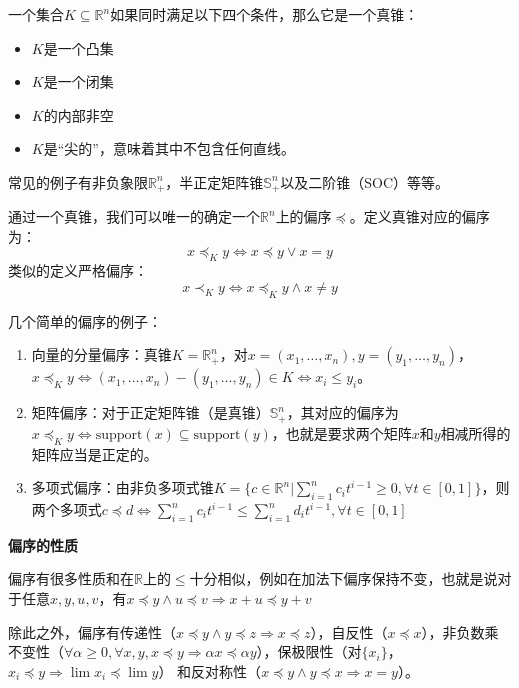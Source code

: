 \documentclass[12pt,a4paper]{book}
\begin{document}
一个集合$K\subseteq\mathbb{R}^n$如果同时满足以下四个条件，那么它是一个真锥：
\begin{itemize}
    \item $K$是一个凸集
    \item $K$是一个闭集
    \item $K$的内部非空
    \item $K$是“尖的”，意味着其中不包含任何直线。
\end{itemize}
常见的例子有非负象限$\mathbb{R}^n_+$，半正定矩阵锥$\mathbb{S}^n_+$以及二阶锥（SOC）等等。

通过一个真锥，我们可以唯一的确定一个$\mathbb{R}^n$上的偏序$\preceq$。定义真锥对应的偏序为：
\begin{equation}
    x\preceq_K y \Leftrightarrow x\preceq y \vee x=y
\end{equation}
类似的定义严格偏序：
\begin{equation}
    x\prec_K y \Leftrightarrow x\preceq_K y \wedge x\neq y
\end{equation}

几个简单的偏序的例子：
\begin{enumerate}
    \item 向量的分量偏序：真锥$K=\mathbb{R}^n_+$，对$x = (x_1,\ldots,x_n),y=(y_1,\ldots,y_n)$，$x\preceq_K y \Leftrightarrow (x_1,\ldots,x_n) - (y_1,\ldots,y_n) \in K \Leftrightarrow x_i\leq y_i$。
    \item 矩阵偏序：对于正定矩阵锥（是真锥）$\mathbb{S}^n_+$，其对应的偏序为$x\preceq_K y \Leftrightarrow \text{support}(x)\subseteq \text{support}(y)$，也就是要求两个矩阵$x$和$y$相减所得的矩阵应当是正定的。
    \item 多项式偏序：由非负多项式锥$K=\{c\in\mathbb{R}^n|\sum_{i=1}^n c_it^{i-1}\geq 0,\forall t \in [0,1]\}$，则两个多项式$c\preceq d \Leftrightarrow \sum_{i=1}^n c_it^{i-1} \leq \sum_{i=1}^n d_it^{i-1},\forall t\in [0,1]$
\end{enumerate}

\textbf{偏序的性质}

偏序有很多性质和在$\mathbb{R}$上的$\leq$十分相似，例如在加法下偏序保持不变，也就是说对于任意$x,y,u,v$，有$x\preceq y \wedge u\preceq v \Rightarrow  x+u\preceq y+v$

除此之外，偏序有传递性（$x\preceq y \wedge y\preceq z\Rightarrow x\preceq z$），自反性（$x\preceq x$），非负数乘不变性（$\forall \alpha \geq 0, \forall x,y,x\preceq y \Rightarrow \alpha x\preceq \alpha y$），保极限性（对$\{x_i\}$，$x_i\preceq y \Rightarrow \lim x_i\preceq \lim y$）
和反对称性（$x\preceq y \wedge y\preceq x \Rightarrow x=y$）。
\end{document}
